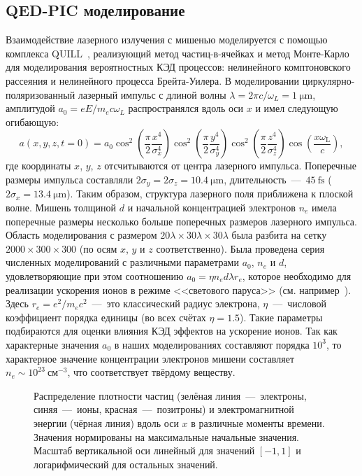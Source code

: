 \subsection{QED-PIC моделирование}
Взаимодействие лазерного излучения с мишенью моделируется с помощью комплекса QUILL~\cite{QUILL}, реализующий метод частиц-в-ячейках и метод Монте-Карло для моделирования вероятностных КЭД процессов: нелинейного комптоновского рассеяния и нелинейного процесса Брейта-Уилера.
В моделировании циркулярно-поляризованный лазерный импульс с длиной волны $\lambda=2\pi c/\omega_{L}=\SI{1}{\um}$, амплитудой $a_{0}=eE/m_{e}c\omega_{L}$ распространялся вдоль оси $x$ и имел следующую огибающую:
\begin{equation}
    a(x,y,z,t=0) =  a_0 \cos^2 \left( \frac{ \pi }{2}   \frac{x^4}{\sigma_x^4 } \right) \cos^2 \left( \frac{ \pi}{2}   \frac{y^4}{\sigma_y ^4 } \right) \cos^2 \left( \frac{ \pi}{2}   \frac{z^4}{\sigma_z ^4 } \right)\cos \left( \frac {x \omega_\mathrm{L} } {c} \right),
\end{equation}  
где координаты $x$, $y$, $z$ отсчитываются от центра лазерного импульса.
Поперечные размеры импульса составляли $2\sigma_y = 2\sigma_z = \SI{10.4}{\um}$, длительность~---~$\SI{45}{\femto\second}$ ($2 \sigma_x = \SI{13.4}{\um}$).
Таким образом, структура лазерного поля приближена к плоской волне.
Мишень толщиной $d$ и начальной концентрацией электронов $n_e$ имела поперечные размеры несколько больше поперечных размеров лазерного импульса.
Область моделирования с размером $20\lambda\times30\lambda\times30\lambda$ была разбита на сетку $2000\times300\times300$ (по осям $x$, $y$ и $z$ соответственно).
Была проведена серия численных моделирований с различными параметрами $a_{0}$, $n_{e}$ и $d$, удовлетворяющие при этом соотношению $a_{0}=\eta n_{e}d\lambda r_{e}$, которое необходимо для реализации ускорения ионов в режиме <<светового паруса>> (см. например~\cite{macchi2013ion}).
Здесь $r_{e}=e^{2}/m_{e}c^{2}$~---~это классический радиус электрона, $\eta$~---~числовой коэффициент порядка единицы (во всех счётах $\eta=1.5$).
Такие параметры подбираются для оценки влияния КЭД эффектов на ускорение ионов.
Так как характерные значения $a_0$ в наших моделированиях составляют порядка $10^3$, то характерное значение концентрации электронов мишени составляет $n_e\sim10^{23}\ \text{см}^{-3}$, что соответствует твёрдому веществу.

\begin{figure}[h!]
	\caption[Распределение плотности частиц и электромагнитной энергии в различные моменты времени в численном моделировании]{\label{Sim_res} Распределение плотности частиц (зелёная линия~---~электроны, синяя~---~ионы, красная~---~позитроны) и электромагнитной энергии (чёрная линия) вдоль оси $x$ в различные моменты времени. Значения нормированы на максимальные начальные значения. Масштаб вертикальной оси линейный для значений $[-1,1]$ и логарифмический для остальных значений.}
\end{figure}

